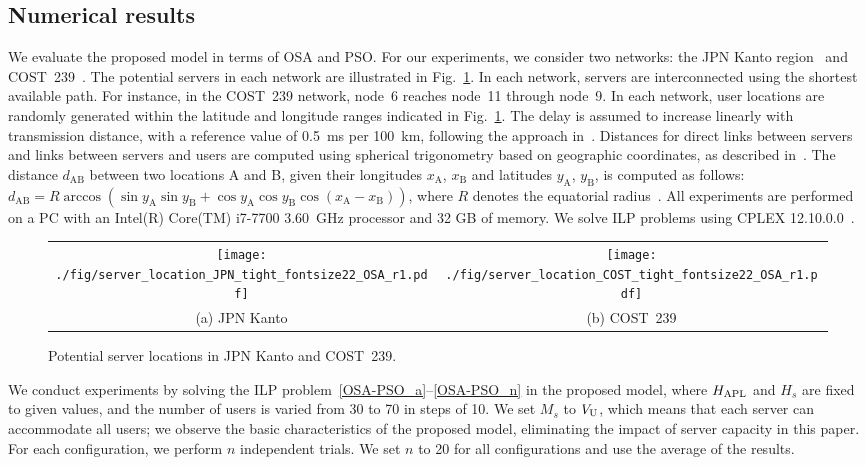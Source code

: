 \documentclass[10pt, letterpaper]{IEEEtran}
\begin{document}
\begin{CJK}{UTF8}{ipxm}
\section{Numerical results}
\label{sec:numerical_results}
We evaluate the proposed model in terms of OSA and PSO.
% 
For our experiments, we consider two networks: the JPN Kanto region~\cite{JPN} and COST~239~\cite{COST}. 
The potential servers in each network are illustrated in Fig.~\ref{fig:ServerLocation}.
In each network, servers are interconnected using the shortest available path.
For instance, in the COST~239 network, node~6 reaches node~11 through node~9.
In each network, user locations are randomly generated within the latitude and longitude ranges indicated in Fig.~\ref{fig:ServerLocation}.
The delay is assumed to increase linearly with transmission distance, with a reference value of 0.5~ms per 100~km, following the approach in~\cite{KawabataICC2023}.
Distances for direct links between servers and links between servers and users are computed using spherical trigonometry based on geographic coordinates, as described in~\cite{12Imanaka2024}.
The distance $d_\mathrm{AB}$ between two locations A and B, given their longitudes $x_\mathrm{A}$, $x_\mathrm{B}$ and latitudes $y_\mathrm{A}$, $y_\mathrm{B}$, is computed as follows:
$d_\mathrm{AB} = R \arccos\left( \sin y_\mathrm{A} \sin y_\mathrm{B} + \cos y_\mathrm{A} \cos y_\mathrm{B} \cos(x_\mathrm{A} - x_\mathrm{B}) \right)$,
where $R$ denotes the equatorial radius~\cite{Zohora2018}.
All experiments are performed on a PC with an Intel(R) Core(TM) i7-7700 3.60~GHz processor and 32 GB of memory.
We solve ILP problems using CPLEX 12.10.0.0~\cite{CPLEX}.
\begin{figure}[t]
  \begin{center}
      \begin{tabular}{cc}
      \texttt{[image: ./fig/server\_location\_JPN\_tight\_fontsize22\_OSA\_r1.pdf]} &
      \texttt{[image: ./fig/server\_location\_COST\_tight\_fontsize22\_OSA\_r1.pdf]} \\
      (a) JPN Kanto & (b) COST~239
      \end{tabular}
  \end{center}
  \caption{Potential server locations in JPN Kanto and COST~239.}
  \label{fig:ServerLocation}
\end{figure}

We conduct experiments by solving the ILP problem~\eqref{OSA-PSO_a}--\eqref{OSA-PSO_n} in the proposed model, where $H_{\rm APL}$ and $H_s$ are fixed to given values, and the number of users is varied from 30 to 70 in steps of 10.
We set $M_s$ to $V_{\rm U}$, which means that each server can accommodate all users; we observe the basic characteristics of the proposed model, eliminating the impact of server capacity in this paper.
For each configuration, we perform $n$ independent trials.
We set $n$ to 20 for all configurations
and use the average of the results.


\end{CJK}
\end{document}
